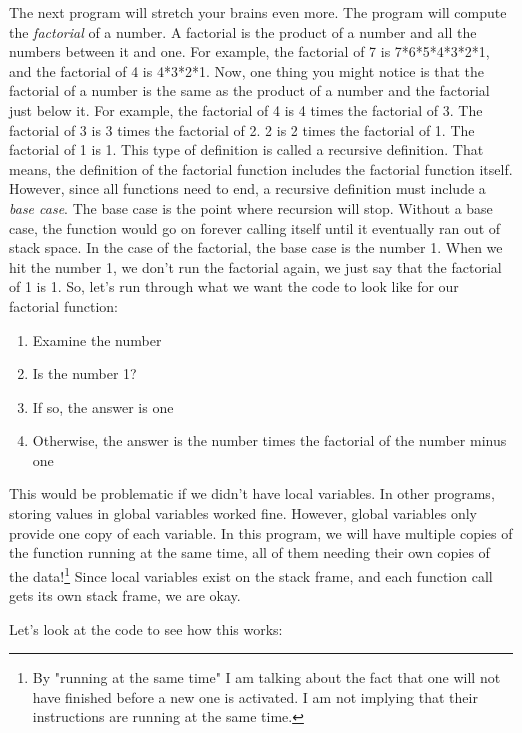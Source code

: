 The next program will stretch your brains even
more.  The program will compute the 
\emph{factorial} of a number.  A
factorial is the product of a number and all the numbers between it
and one.  For example, the factorial of 7 is 7*6*5*4*3*2*1, and the
factorial of 4 is 4*3*2*1.  Now, one thing you might notice is that
the factorial of a number is the same as the product of a number and
the factorial just below it.  For example, the factorial of 4 is
4 times the factorial of 3.  The factorial of 3 is 3 times the factorial
of 2.  2 is 2 times the factorial of 1.  The factorial of 1 is 1.  
This type of definition is called a recursive definition.  That means,
the definition of the factorial function includes the factorial function itself. 
However, since all functions need to end, a recursive definition must
include a \emph{base case}.  The base case is the
point where recursion will stop.  Without a base case, the function would
go on forever calling itself until it eventually ran out of stack space.  
In the case of the factorial, the base case
is the number 1.  When we hit the number 1, we don't run the factorial
again, we just say that the factorial of 1 is 1.  So, let's run through
what we want the code to look like for our factorial 
function:

\begin{enumerate}\item Examine the number 
\item Is the number 1? 
\item If so, the answer is one 
\item Otherwise, the answer is the number times the factorial of the number minus one 
\end{enumerate}

This would be problematic if we didn't have local variables.
In other programs, storing values in global variables worked fine.  However,
global variables only provide one copy of each variable.  In this program,
we will have multiple copies of the function running at the same time, all
of them needing their own copies of the data!\footnote{By "running
at the same time" I am talking about the fact that one will not have
finished before a new one is activated.  I am not implying that their
instructions are running at the same time.}
Since local variables exist on the stack frame, and each function call
gets its own stack frame, we are okay.

Let's look at the code to see how this works:

